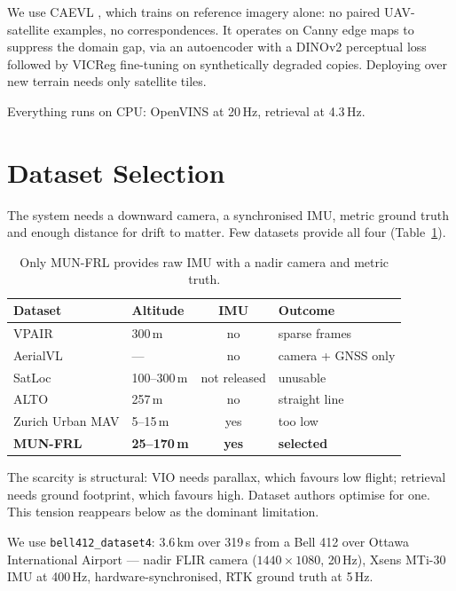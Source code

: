 \documentclass[conference]{IEEEtran}
\begin{document}
We use CAEVL \cite{caevl2025}, which trains on reference imagery alone: no
paired UAV-satellite examples, no correspondences. It operates on Canny edge
maps \cite{canny1986} to suppress the domain gap, via an autoencoder with a
DINOv2 \cite{oquab2024dinov2} perceptual loss followed by VICReg
\cite{bardes2022vicreg} fine-tuning on synthetically degraded copies. Deploying
over new terrain needs only satellite tiles.

Everything runs on CPU: OpenVINS at 20\,Hz, retrieval at 4.3\,Hz.

\section{Dataset Selection}

The system needs a downward camera, a synchronised IMU, metric ground truth and
enough distance for drift to matter. Few datasets provide all four
(Table~\ref{tab:datasets}).

\begin{table}[H]
\centering
\caption{Only MUN-FRL provides raw IMU with a nadir camera and metric truth.}
\label{tab:datasets}
\begin{tabular}{@{}llcl@{}}
\toprule
Dataset & Altitude & IMU & Outcome \\
\midrule
VPAIR \cite{schleiss2022vpair}   & 300\,m      & no  & sparse frames \\
AerialVL \cite{hu2024aerialvl}   & ---         & no  & camera + GNSS only \\
SatLoc                            & 100--300\,m & not released & unusable \\
ALTO                              & 257\,m      & no  & straight line \\
Zurich Urban MAV                  & 5--15\,m    & yes & too low \\
\textbf{MUN-FRL} \cite{thalagala2024munfrl} & \textbf{25--170\,m} & \textbf{yes} & \textbf{selected} \\
\bottomrule
\end{tabular}
\end{table}

The scarcity is structural: VIO needs parallax, which favours low flight;
retrieval needs ground footprint, which favours high. Dataset authors optimise
for one. This tension reappears below as the dominant limitation.

We use \texttt{bell412\_dataset4}: 3.6\,km over 319\,s from a Bell 412 over
Ottawa International Airport --- nadir FLIR camera ($1440\times1080$, 20\,Hz),
Xsens MTi-30 IMU at 400\,Hz, hardware-synchronised, RTK ground truth at 5\,Hz.
\end{document}

